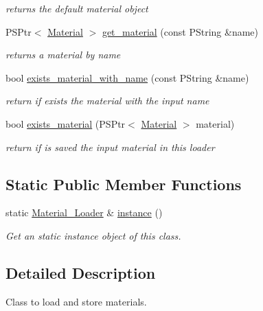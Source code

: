 \begin{DoxyCompactItemize}
\begin{DoxyCompactList}\small\item\em returns the default material object \end{DoxyCompactList}\item 
P\+S\+Ptr$<$ \mbox{\hyperlink{classprz_1_1_material}{Material}} $>$ \mbox{\hyperlink{classprz_1_1_material___loader_a2eb8615a2067fed29e1d3425c9c79318}{get\+\_\+material}} (const P\+String \&name)
\begin{DoxyCompactList}\small\item\em returns a material by name \end{DoxyCompactList}\item 
bool \mbox{\hyperlink{classprz_1_1_material___loader_a1cd698bffd010f816ce4e84e66213647}{exists\+\_\+material\+\_\+with\+\_\+name}} (const P\+String \&name)
\begin{DoxyCompactList}\small\item\em return if exists the material with the input name \end{DoxyCompactList}\item 
bool \mbox{\hyperlink{classprz_1_1_material___loader_a1f790777071e92d5bcd4603b65736aa4}{exists\+\_\+material}} (P\+S\+Ptr$<$ \mbox{\hyperlink{classprz_1_1_material}{Material}} $>$ material)
\begin{DoxyCompactList}\small\item\em return if is saved the input material in this loader \end{DoxyCompactList}\end{DoxyCompactItemize}
\subsection*{Static Public Member Functions}
\begin{DoxyCompactItemize}
\item 
static \mbox{\hyperlink{classprz_1_1_material___loader}{Material\+\_\+\+Loader}} \& \mbox{\hyperlink{classprz_1_1_material___loader_a5fa3903db95525602037c029debb6532}{instance}} ()
\begin{DoxyCompactList}\small\item\em Get an static instance object of this class. \end{DoxyCompactList}\end{DoxyCompactItemize}


\subsection{Detailed Description}
Class to load and store materials. 



